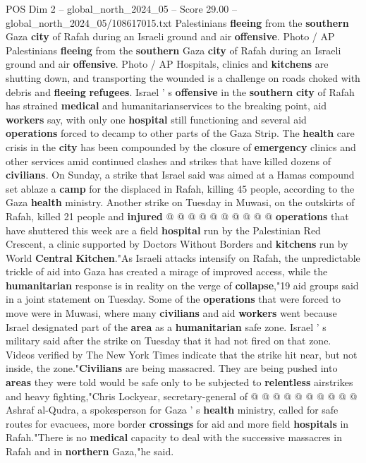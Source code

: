\begin{textsample}{POS Dim 2 – global\_north\_2024\_05 – Score 29.00 – global\_north\_2024\_05/108617015.txt}  \label{ex:f2_pos_299}
Palestinians \textbf{fleeing} from the \textbf{southern} Gaza \textbf{city} of Rafah during an Israeli ground and air \textbf{offensive}.
Photo / AP Palestinians \textbf{fleeing} from the \textbf{southern} Gaza \textbf{city} of Rafah during an Israeli ground and air \textbf{offensive}.
Photo / AP Hospitals, clinics and \textbf{kitchens} are shutting down, and transporting the wounded is a challenge on roads choked with debris and \textbf{fleeing} \textbf{refugees}.
Israel ' s \textbf{offensive} in the \textbf{southern} \textbf{city} of Rafah has strained \textbf{medical} and humanitarianservices to the breaking point, aid \textbf{workers} say, with only one \textbf{hospital} still functioning and several aid \textbf{operations} forced to decamp to other parts of the Gaza Strip.
The \textbf{health} care crisis in the \textbf{city} has been compounded by the closure of \textbf{emergency} clinics and other services amid continued clashes and strikes that have killed dozens of \textbf{civilians}.
On Sunday, a strike that Israel said was aimed at a Hamas compound set ablaze a \textbf{camp} for the displaced in Rafah, killing 45 people, according to the Gaza \textbf{health} ministry.
Another strike on Tuesday in Muwasi, on the outskirts of Rafah, killed 21 people and \textbf{injured} @ @ @ @ @ @ @ @ @ @ \textbf{operations} that have shuttered this week are a field \textbf{hospital} run by the Palestinian Red Crescent, a clinic supported by Doctors Without Borders and \textbf{kitchens} run by World \textbf{Central} \textbf{Kitchen}."As Israeli attacks intensify on Rafah, the unpredictable trickle of aid into Gaza has created a mirage of improved access, while the \textbf{humanitarian} response is in reality on the verge of \textbf{collapse},"19 aid groups said in a joint statement on Tuesday.
Some of the \textbf{operations} that were forced to move were in Muwasi, where many \textbf{civilians} and aid \textbf{workers} went because Israel designated part of the \textbf{area} as a \textbf{humanitarian} safe zone.
Israel ' s military said after the strike on Tuesday that it had not fired on that zone.
Videos verified by The New York Times indicate that the strike hit near, but not inside, the zone."\textbf{Civilians} are being massacred.
They are being pushed into \textbf{areas} they were told would be safe only to be subjected to \textbf{relentless} airstrikes and heavy fighting,"Chris Lockyear, secretary-general of @ @ @ @ @ @ @ @ @ @ Ashraf al-Qudra, a spokesperson for Gaza ' s \textbf{health} ministry, called for safe routes for evacuees, more border \textbf{crossings} for aid and more field \textbf{hospitals} in Rafah."There is no \textbf{medical} capacity to deal with the successive massacres in Rafah and in \textbf{northern} Gaza,"he said.

\end{textsample}
